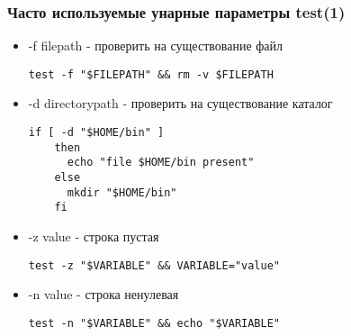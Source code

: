 \begin{frame}[fragile]
  \frametitle{Часто используемые унарные параметры test(1)}
  \begin{itemize}
    \item \alert{-f filepath} - проверить на существование файл
\begin{lstlisting}[basicstyle=\normalsize]
	test -f "$FILEPATH" && rm -v $FILEPATH
\end{lstlisting} \pause
    \item \alert{-d directorypath} - проверить на существование каталог
\begin{lstlisting}[basicstyle=\tiny]
	if [ -d "$HOME/bin" ]
	then 
	  echo "file $HOME/bin present"
	else
	  mkdir "$HOME/bin"
	fi
\end{lstlisting} \pause
    \item \alert{-z \textquotedbl value\textquotedbl } - строка пустая
\begin{lstlisting}[basicstyle=\normalsize]
	test -z "$VARIABLE" && VARIABLE="value"
\end{lstlisting} \pause
    \item \alert{-n \textquotedbl value\textquotedbl } - строка ненулевая
\begin{lstlisting}[basicstyle=\normalsize]
	test -n "$VARIABLE" && echo "$VARIABLE"
\end{lstlisting} 
  \end{itemize}

\end{frame}

